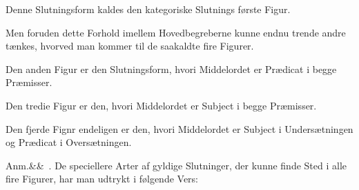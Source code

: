 \documentclass[12pt]{book}
\def\sperr#1{#1}%
\def\textit#1{#1}%
\newcommand{\sperr}[1]{\textls[180]{#1}}
\newcommand{\anm}[1]{%
  \par\vspace{0.5\baselineskip}%
  \noindent\hspace{\parindent}\sperr{Anm.}\ifx&#1&\else~\textit{#1}.\fi
  \enspace\ignorespaces
}
\newcommand{\opage}[1]{\marginnote{\footnotesize\textit{[#1]}}}
\begin{document}
Denne Slutningsform kaldes den kategoriske Slutnings første Figur.

Men foruden dette Forhold imellem Hovedbegreberne kunne endnu trende andre
tænkes, hvorved man kommer til de saakaldte fire Figurer.

Den anden Figur er den Slutningsform, hvori Middelordet er Prædicat i begge
Præmisser.

Den tredie Figur er den, hvori Middelordet er Subject i begge Præmisser.

Den fjerde Fignr endeligen er den, hvori Middelordet er Subject i
Undersætningen og Prædicat i Oversætningen.
\opage{340} \anm{} De speciellere Arter af gyldige Slutninger, der kunne finde Sted i alle
fire Figurer, har man udtrykt i følgende Vers:
\end{document}
